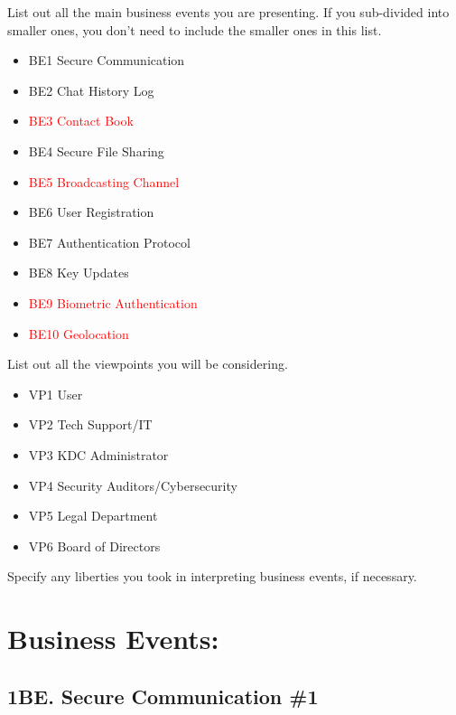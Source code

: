 \documentclass[]{article}
\begin{document}
 List out all the main business events you are presenting. If you sub-divided into smaller ones, you don't need to include the smaller ones in this list.\\

\begin{itemize}
	\item BE1 Secure Communication
	\item BE2 Chat History Log
	\item[\textcolor{red}{\textbullet}] \textcolor{red}{BE3 Contact Book}
	\item BE4 Secure File Sharing
	\item[\textcolor{red}{\textbullet}] \textcolor{red}{BE5 Broadcasting Channel}
	\item BE6 User Registration
	\item BE7 Authentication Protocol
	\item BE8 Key Updates
	\item[\textcolor{red}{\textbullet}] \textcolor{red}{BE9 Biometric Authentication}
	\item[\textcolor{red}{\textbullet}] \textcolor{red}{BE10 Geolocation}

\end{itemize}

 List out all the viewpoints you will be considering.\\

\begin{itemize}
	\item VP1 User
	\item 	VP2 Tech Support/IT
	\item 	VP3 KDC Administrator
	\item 	VP4 Security Auditors/Cybersecurity
	\item 	VP5 Legal Department
	\item 	VP6 Board of Directors


\end{itemize}

 Specify any liberties you took in interpreting business events, if necessary.\\

\section*{Business Events:}
\subsection*{1BE. Secure Communication \#1}
\end{document}
